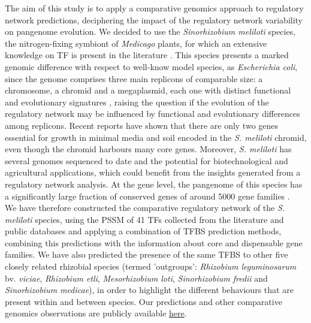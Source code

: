 The aim of this study is to apply a comparative genomics approach to regulatory network predictions, deciphering the impact of the regulatory network variability on pangenome evolution. We decided to use the \textit{Sinorhizobium meliloti} species, the nitrogen-fixing symbiont of \textit{Medicago} plants, for which an extensive knowledge on TF is present in the literature \cite{krol2011rhizoregnet, schluter2013global}. This species presents a marked genomic difference with respect to well-know model species, as \textit{Escherichia coli}, since the genome comprises three main replicons of comparable size: a chromosome, a chromid \cite{harrison2010introducing} and a megaplasmid, each one with distinct functional and evolutionary signatures \cite{galibert2001composite, galardini2013replicon}, raising the question if the evolution of the regulatory network may be influenced by functional and evolutionary differences among replicons. Recent reports have shown that there are only two genes essential for growth in minimal media and soil encoded in the \textit{S. meliloti} chromid\cite{maclean2014examination}, even though the chromid harbours many core genes. Moreover, \textit{S. meliloti} has several genomes sequenced to date \cite{galibert2001composite, galardini2011exploring, schneiker2011complete, li2012draft, sugawara2013comparative, weidner2013genome, martinez2013complete, sallet2013next, Galardini2013sigs} and the potential for biotechnological and agricultural applications, which could benefit from the insights generated from a regulatory network analysis. At the gene level, the pangenome of this species has a significantly large fraction of conserved genes of around 5000 gene families \cite{galardini2013replicon, sugawara2013comparative}.\\
We have therefore constructed the comparative regulatory network of the \textit{S. meliloti} species, using the PSSM of 41 TFs collected from the literature and public databases and applying a combination of TFBS prediction methods, combining this predictions with the information about core and dispensable gene families. We have also predicted the presence of the same TFBS to other five closely related rhizobial species (termed 'outgroups': \textit{Rhizobium leguminosarum} bv. \textit{viciae}, \textit{Rhizobium etli}, \textit{Mesorhizobium loti}, \textit{Sinorhizobium fredii} and \textit{Sinorhizobium medicae}), in order to highlight the different behaviours that are present within and between species. Our predictions and other comparative genomics observations are publicly available \href{https://github.com/combogenomics/rhizoreg/tree/paper}{here}.\\

